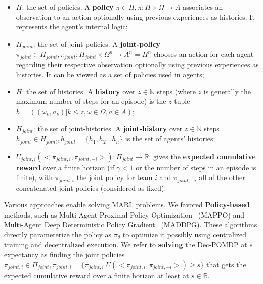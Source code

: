 \documentclass[runningheads]{llncs}
\theoremstyle{freethm}
\theoremstyle{proofoutline}
\begin{document}
\begin{itemize}

    \item $\Pi$: the set of policies. A \textbf{policy} $\pi \in \Pi, \pi: H \times \Omega \rightarrow A$ associates an observation to an action optionally using previous experiences as histories. It represents the agent's internal logic;
    \item $\Pi_{joint}$: the set of joint-policies. A \textbf{joint-policy} $\pi_{joint} \in \Pi_{joint}, \pi_{joint}: H_{joint} \times \Omega^n \rightarrow A^n = \Pi^n$ chooses an action for each agent regarding their respective observation optionally using previous experiences as histories. It can be viewed as a set of policies used in agents;
    \item $H$: the set of histories. A \textbf{history} over $z \in \mathbb{N}$ steps (where $z$ is generally the maximum number of steps for an episode) is the $z$-tuple $h = ((\omega_{k}, a_{k}) | k \leq z, \omega \in \Omega, a \in A)$;
    \item $H_{joint}$: the set of joint-histories. A \textbf{joint-history} over $z \in \mathbb{N}$ steps $h_{joint} \in H_{joint}, h_{joint} = \{h_1,h_2 \dots h_n\}$ is the set of agents' histories;
    \item $U_{joint,i}(<\pi_{joint,i}, \pi_{joint,-i}>): \Pi_{joint} \rightarrow \mathbb{R}$: gives the \textbf{expected cumulative reward} over a finite horizon (if $\gamma < 1$ or the number of steps in an episode is finite), with $\pi_{joint,i}$ the joint policy for team $i$ and $\pi_{joint,-i}$ all of the other concatenated joint-policies (considered as fixed).
\end{itemize}

Various approaches enable solving MARL problems. We favored \textbf{Policy-based} methods, such as Multi-Agent Proximal Policy Optimization~\cite{yu2022surprising} (MAPPO) and Multi-Agent Deep Deterministic Policy Gradient~\cite{Lowe2017} (MADDPG). These algorithms directly parameterize the policy as $\pi_\theta$ to optimize it possibly using centralized training and decentralized execution.
We refer to \textbf{solving} the Dec-POMDP at $s$ expectancy as finding the joint policies $\pi_{joint,i} \in \Pi_{joint}, \pi_{joint,i} = \{\pi_{joint,i} | U(<\pi_{joint,i},\pi_{joint,-i}>) \geq s\}$ that gets the expected cumulative reward over a finite horizon at least at $s \in \mathbb{R}$.
\end{document}
